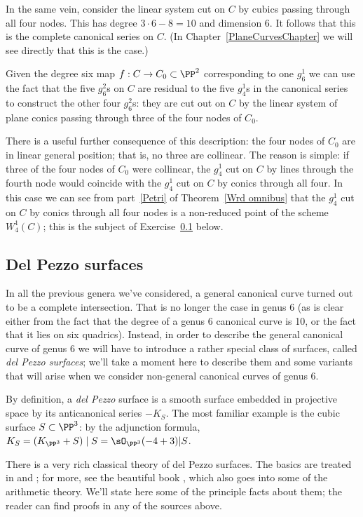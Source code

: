 In the same vein, consider the linear system cut on $C$ by cubics passing through all four nodes. This has degree $3\cdot 6 - 8 = 10$ and dimension 6. It follows that this is the complete canonical series on $C$. (In Chapter~\ref{PlaneCurvesChapter} we will see directly that this is the case.)

Given the degree six map $f : C \to C_0 \subset \PP^2$ corresponding to one $g^1_6$ we can use the fact that the five $g^2_6$s on $C$ are residual to the five $g^1_4$s in the canonical series to construct the other four $g^2_6$s: they are cut out on $C$ by the linear system of plane conics passing through three of the four nodes of $C_0$.

There is a useful further consequence of this description: the four nodes of $C_0$ are in linear general position; that is, no three are collinear. The reason is simple: if three of the four nodes of $C_0$ were collinear, the $g^1_4$ cut on $C$ by lines through the fourth node would coincide with the $g^1_4$ cut on $C$ by conics through all four. In this case we can see from part~\ref{Petri} of Theorem~\ref{Wrd omnibus} that the $g^1_4$ cut on $C$ by conics through all four nodes is a non-reduced point of the scheme $W^1_4(C)$; this is the subject of Exercise~\ref{} below. 

\subsection{Del Pezzo surfaces}

In all the previous genera we've considered, a general canonical curve turned out to be a complete intersection. That is no longer the case in genus 6 (as is clear either from the fact that the degree of a genus 6 canonical curve is 10, or the fact that it lies on six quadrics). Instead, in order to describe the general canonical curve of genus 6 we will have to introduce a rather special class of surfaces, called \emph{del Pezzo surfaces}; we'll take a moment here to describe them and some variants that will arise when we consider non-general canonical curves of genus 6.



By definition,
a \emph{del Pezzo} surface is a smooth surface embedded in projective space by its anticanonical series $-K_S$. The most familiar example is the cubic surface $S \subset \PP^3$: by the adjunction formula, $K_S = (K_{\PP^3}+S)\mid S
= \sO_{\PP^3}(-4+3)|S$. 


There is a very rich classical theory of del Pezzo surfaces. The basics are treated in \cite{Beauville} and \cite{Griffiths-Harris1978}; for more, see the
beautiful book \cite{Manin}, which also goes into some of the arithmetic theory. We'll state here some of the principle facts about them; the reader can find proofs in any of the sources above.

